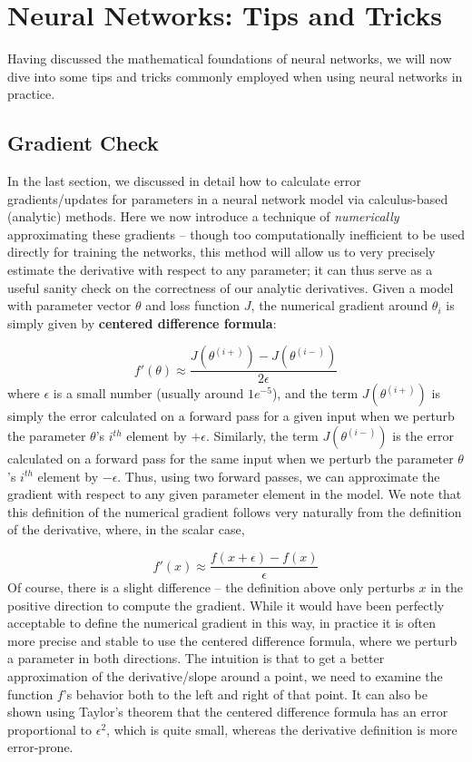 \documentclass{tufte-handout}
\begin{document}
\section{Neural Networks: Tips and Tricks}\label{sec:nnetstips}

Having discussed the mathematical foundations of neural networks, we will now dive into some tips and tricks commonly employed when using neural networks in practice.

\subsection{Gradient Check}
In the last section, we discussed in detail how to calculate error gradients/updates for parameters in a neural network model via calculus-based (analytic) methods. Here we now introduce a technique of \textit{numerically} approximating these gradients -- though too computationally inefficient to be used directly for training the networks, this method will allow us to very precisely estimate the derivative with respect to any parameter; it can thus serve as a useful sanity check on the correctness of our analytic derivatives. Given a model with parameter vector $\theta$ and loss function $J$, the numerical gradient around $\theta_i$ is simply given by \textbf{centered difference formula}:

$$ f'(\theta) \approx \frac{J(\theta^{(i+)}) - J(\theta^{(i-)})}{2 \epsilon}$$
where $\epsilon$ is a small number (usually around $1e^{-5}$), and the term $J(\theta^{(i+)})$ is simply the error calculated on a forward pass for a given input when we perturb the parameter $\theta$'s $i^{th}$ element by $+\epsilon$. Similarly, the term $J(\theta^{(i-)})$ is the error calculated on a forward pass for the same input when we perturb the parameter $\theta$'s $i^{th}$ element by $-\epsilon$. Thus, using two forward passes, we can approximate the gradient with respect to any given parameter element in the model. We note that this definition of the numerical gradient follows very naturally from the definition of the derivative, where, in the scalar case,

$$f'(x) \approx \dfrac{f(x + \epsilon) - f(x)}{\epsilon}$$
Of course, there is a slight difference -- the definition above only perturbs $x$ in the positive direction to compute the gradient. While it would have been perfectly acceptable to define the numerical gradient in this way, in practice it is often more precise and stable to use the {centered difference formula}, where we perturb a parameter in both directions. The intuition is that to get a better approximation of the derivative/slope around a point, we need to examine the function $f$'s behavior both to the left and right of that point. It can also be shown using Taylor's theorem that the centered difference formula has an error proportional to $\epsilon^2$, which is quite small, whereas the derivative definition is more error-prone.
\end{document}
